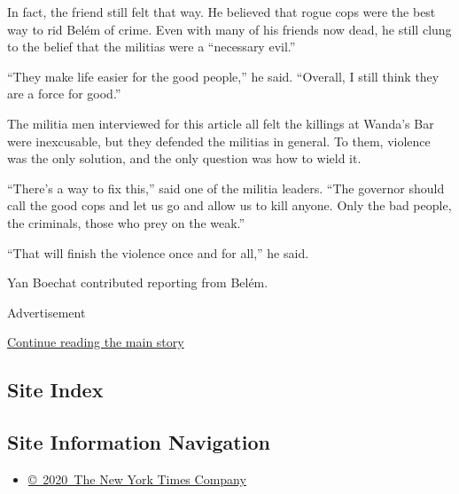 In fact, the friend still felt that way. He believed that rogue cops
were the best way to rid Belém of crime. Even with many of his friends
now dead, he still clung to the belief that the militias were a
``necessary evil.''

``They make life easier for the good people,'' he said. ``Overall, I
still think they are a force for good.''

The militia men interviewed for this article all felt the killings at
Wanda's Bar were inexcusable, but they defended the militias in general.
To them, violence was the only solution, and the only question was how
to wield it.

``There's a way to fix this,'' said one of the militia leaders. ``The
governor should call the good cops and let us go and allow us to kill
anyone. Only the bad people, the criminals, those who prey on the
weak.''

``That will finish the violence once and for all,'' he said.

Yan Boechat contributed reporting from Belém.

Advertisement

\protect\hyperlink{after-bottom}{Continue reading the main story}

\hypertarget{site-index}{%
\subsection{Site Index}\label{site-index}}

\hypertarget{site-information-navigation}{%
\subsection{Site Information
Navigation}\label{site-information-navigation}}

\begin{itemize}
\tightlist
\item
  \href{https://help.nytimes3xbfgragh.onion/hc/en-us/articles/115014792127-Copyright-notice}{©~2020~The
  New York Times Company}
\end{itemize}

